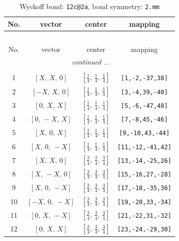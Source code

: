 \documentclass[fleqn,8pt]{jsarticle}
\begin{document}
\begin{longtable}{cccc}
\caption{Wyckoff bond: {\tt 12c@2a}, bond symmetry: {\tt 2.mm}}
 \\
 \hline \hline
No. & vector & center & mapping \\ \hline \endfirsthead

\multicolumn{3}{l}{\tablename\ \thetable{}} \\
 \hline \hline
No. & vector & center & mapping \\ \hline \endhead

 \hline \hline
\multicolumn{3}{r}{\footnotesize\it continued ...} \\ \endfoot

 \hline \hline
\multicolumn{3}{r}{} \\ \endlastfoot

1 & $\left[ X,\, X,\, 0 \right]$ & $\left[ \frac{1}{4},\, \frac{1}{4},\, \frac{1}{4} \right]$ & {\tt [1,-2,-37,38]} \\ \hline
2 & $\left[ - X,\, X,\, 0 \right]$ & $\left[ \frac{1}{4},\, \frac{1}{4},\, \frac{1}{4} \right]$ & {\tt [3,-4,39,-40]} \\ \hline
3 & $\left[ 0,\, X,\, X \right]$ & $\left[ \frac{1}{4},\, \frac{1}{4},\, \frac{1}{4} \right]$ & {\tt [5,-6,-47,48]} \\ \hline
4 & $\left[ 0,\, - X,\, X \right]$ & $\left[ \frac{1}{4},\, \frac{1}{4},\, \frac{1}{4} \right]$ & {\tt [7,-8,45,-46]} \\ \hline
5 & $\left[ X,\, 0,\, X \right]$ & $\left[ \frac{1}{4},\, \frac{1}{4},\, \frac{1}{4} \right]$ & {\tt [9,-10,43,-44]} \\ \hline
6 & $\left[ X,\, 0,\, - X \right]$ & $\left[ \frac{1}{4},\, \frac{1}{4},\, \frac{1}{4} \right]$ & {\tt [11,-12,-41,42]} \\ \hline
7 & $\left[ X,\, X,\, 0 \right]$ & $\left[ \frac{3}{4},\, \frac{3}{4},\, \frac{3}{4} \right]$ & {\tt [13,-14,-25,26]} \\ \hline
8 & $\left[ X,\, - X,\, 0 \right]$ & $\left[ \frac{3}{4},\, \frac{3}{4},\, \frac{3}{4} \right]$ & {\tt [15,-16,27,-28]} \\ \hline
9 & $\left[ X,\, 0,\, - X \right]$ & $\left[ \frac{3}{4},\, \frac{3}{4},\, \frac{3}{4} \right]$ & {\tt [17,-18,-35,36]} \\ \hline
10 & $\left[ - X,\, 0,\, - X \right]$ & $\left[ \frac{3}{4},\, \frac{3}{4},\, \frac{3}{4} \right]$ & {\tt [19,-20,33,-34]} \\ \hline
11 & $\left[ 0,\, X,\, - X \right]$ & $\left[ \frac{3}{4},\, \frac{3}{4},\, \frac{3}{4} \right]$ & {\tt [21,-22,31,-32]} \\ \hline
12 & $\left[ 0,\, X,\, X \right]$ & $\left[ \frac{3}{4},\, \frac{3}{4},\, \frac{3}{4} \right]$ & {\tt [23,-24,-29,30]} \\
\end{longtable}
\end{document}
